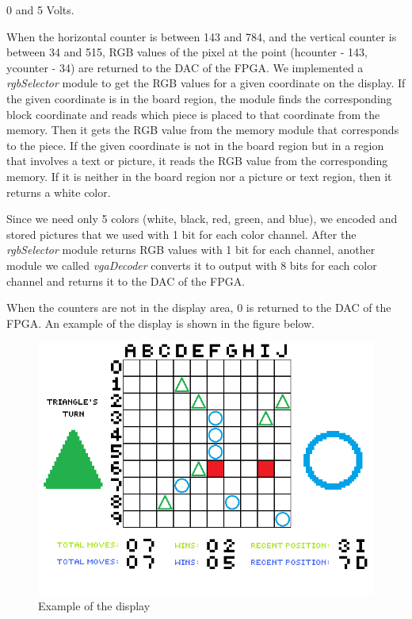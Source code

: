 \documentclass[conference]{IEEEtran}
\begin{document}
0 and 5 Volts. \cite{fpga} \\
\par When the horizontal counter is between 143 and 784, and the vertical counter is between 34 and 515, RGB values of the pixel at the point (hcounter - 143, ycounter - 34) are returned to the DAC of the FPGA. 
We implemented a \textit{rgbSelector} module to get the RGB values for a given coordinate on the display. 
If the given coordinate is in the board region, the module finds the corresponding block coordinate and reads which piece is 
placed to that coordinate from the memory. Then it gets the RGB value from the memory module that corresponds to the piece. 
If the given coordinate is not in the board region but in a region that involves a text or picture, it reads the RGB value from the corresponding memory. 
If it is neither in the board region nor a picture or text region, then it returns a white color. \\
\par Since we need only 5 colors (white, black, red, green, and blue), we encoded and stored pictures that we used with 1 bit for each color channel. 
After the \textit{rgbSelector} module returns RGB values with 1 bit for each channel, 
another module we called \textit{vgaDecoder} converts it to output with 8 bits for each color channel and returns it to the DAC of the FPGA. \\
\par When the counters are not in the display area, 0 is returned to the DAC of the FPGA. 
An example of the display is shown in the figure below.  
\begin{figure}[H]
  \centerline{\includegraphics[scale=0.65]{sample_board.png}}
   \caption{Example of the display}
   \label{Fig. 1.}
\end{figure} 
\end{document}
